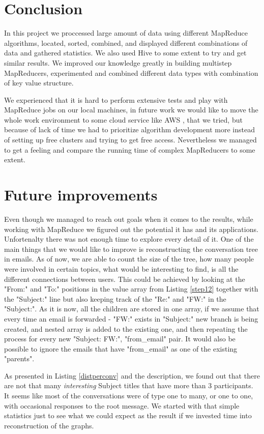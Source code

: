 \documentclass{llncs}
\begin{document}
\section{Conclusion}

In this project we proccessed large amount of data using different MapReduce algorithms, located, sorted, combined, and displayed different combinations of data and gathered statistics. We also used Hive to some extent to try and get similar results. We improved our knowledge greatly in building multistep MapReducers, experimented and combined different data types with combination of key value structure.

We experienced that it is hard to perform extensive tests and play with MapReduce jobs on our local machines, in future work we would like to move the whole work environment to some cloud service like AWS \cite{aws}, that we tried, but because of lack of time we had to prioritize algorithm development more instead of setting up free clusters and trying to get free access. Nevertheless we managed to get a feeling and compare the running time of complex MapReducers to some extent.

\section{Future improvements}
Even though we managed to reach out goals when it comes to the results, while working with MapReduce we figured out the potential it has and its applications. Unfortenalty there was not enough time to explore every detail of it. One of the main things that we would like to improve is reconstructing the conversation tree in emails. As of now, we are able to count the size of the tree, how many people were involved in certain topics, what would be interesting to find, is all the different connections between users. This could be achieved by looking at the "From:" and "To:" positions in the value array from Listing \ref{step12} together with the "Subject:" line but also keeping track of the "Re:" and "FW:" in the "Subject:". As it is now, all the children are stored in one array, if we assume that every time an email is forwarded - "FW:" exists in "Subject:" new branch is being created, and nested array is added to the existing one, and then repeating the process for every new "Subject: FW:", "from\_email" pair. It would also be possible to ignore the emails that have "from\_email" as one of the existing "parents".

As presented in Listing \ref{distperconv} and the description, we found out that there are not that many \emph{interesting} Subject titles that have more than 3 participants. It seems like most of the conversations were of type one to many, or one to one, with occasional responses to the root message. We started with that simple statistics just to see what we could expect as the result if we invested time into reconstruction of the graphs.
\end{document}
